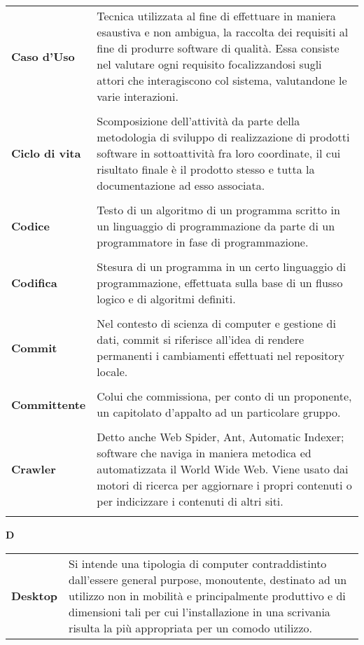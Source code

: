 {\begin{longtable}{L{4cm} p{10cm}}
 \\ 
\textbf{Caso d'Uso} & Tecnica utilizzata al fine di effettuare in maniera esaustiva e non ambigua, la raccolta dei requisiti al fine di produrre software di qualità. Essa consiste nel valutare ogni requisito focalizzandosi sugli attori che interagiscono col sistema, valutandone le varie interazioni. \\ 
 \\ 
\textbf{Ciclo di vita} & Scomposizione dell'attività da parte della metodologia di sviluppo di realizzazione di prodotti software in sottoattività fra loro coordinate, il cui risultato finale è il prodotto stesso e tutta la documentazione ad esso associata. \\ 
 \\ 
\textbf{Codice} & Testo di un algoritmo di un programma scritto in un linguaggio di programmazione da parte di un programmatore in fase di programmazione. \\ 
 \\ 
\textbf{Codifica} & Stesura di un programma in un certo linguaggio di programmazione, effettuata sulla base di un flusso logico e di algoritmi definiti. \\ 
 \\ 
\textbf{Commit} & Nel contesto di scienza di computer e gestione di dati, commit si riferisce all’idea di rendere permanenti i cambiamenti effettuati nel repository locale. \\ 
 \\ 
\textbf{Committente} & Colui che commissiona, per conto di un proponente, un capitolato d’appalto ad un particolare gruppo. \\ 
 \\ 
\textbf{Crawler} & Detto anche Web Spider, Ant, Automatic Indexer; software che naviga in maniera metodica ed automatizzata il World Wide Web. Viene usato dai motori di ricerca per aggiornare i propri contenuti o per indicizzare i contenuti di altri siti. \\ 
 \\ 
\end{longtable} 
\newpage 
{} 
{} 
\hfill\Huge{\textbf{D}} \\ 
\normalsize 
\begin{longtable}{L{4cm} p{10cm}}
\textbf{Desktop} & Si intende una tipologia di computer contraddistinto dall’essere general purpose, monoutente, destinato ad un utilizzo non in mobilità e principalmente produttivo e di dimensioni tali per cui l’installazione in una scrivania risulta la più appropriata per un comodo utilizzo. \\ 

\end{longtable}}
